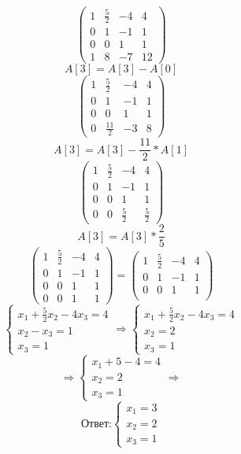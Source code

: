 \documentclass[a4paper]{article}
\renewcommand{\f}[2]{\frac{#1}{#2}}
\renewcommand{\r}{\Rightarrow}
\begin{document}
\begin{enumerate}
\begin{enumerate}
\[\begin{pmatrix}
        1 & \frac{5}{2} & -4 & 4 \\
        0 & 1 & -1 & 1 \\
        0 & 0 & 1 & 1 \\
        1 & 8 & -7 & 12
        \end{pmatrix}
        \]
        \[A[3] = A[3]-A[0]\]
        \[
        \begin{pmatrix}
        1 & \frac{5}{2} & -4 & 4 \\
        0 & 1 & -1 & 1 \\
        0 & 0 & 1 & 1 \\
        0 & \frac{11}{2} & -3 & 8
        \end{pmatrix}
        \]
        \[A[3] = A[3]-\f{11}{2}*A[1]\]
        \[
        \begin{pmatrix}
        1 & \frac{5}{2} & -4 & 4 \\
        0 & 1 & -1 & 1 \\
        0 & 0 & 1 & 1 \\
        0 & 0 & \frac{5}{2} & \frac{5}{2}
        \end{pmatrix}
        \]
        \[A[3] = A[3]*\f{2}{5}\]
        \[
        \begin{pmatrix}
        1 & \frac{5}{2} & -4 & 4 \\
        0 & 1 & -1 & 1 \\
        0 & 0 & 1 & 1 \\
        0 & 0 & 1 & 1
        \end{pmatrix}=
        \begin{pmatrix}
            1 & \frac{5}{2} & -4 & 4 \\
            0 & 1 & -1 & 1 \\
            0 & 0 & 1 & 1 \\
        \end{pmatrix}
        \]
        \[
        \begin{cases}
        x_1 + \frac{5}{2} x_2 - 4 x_3 = 4 \\
        x_2 - x_3 = 1 \\
        x_3 = 1
        \end{cases}
        \r
        \begin{cases}
            x_1 + \frac{5}{2} x_2 - 4 x_3 = 4 \\
            x_2 = 2 \\
            x_3 = 1
        \end{cases}
        \]\[\r
        \begin{cases}
            x_1 + 5 - 4 = 4 \\
            x_2 = 2 \\
            x_3 = 1
        \end{cases}\r\]
        \[ \textbf{Ответ:}
        \begin{cases}
            x_1 = 3 \\
            x_2 = 2 \\
            x_3 = 1
        \end{cases}\]


\end{enumerate}
\end{enumerate}
\end{document}

